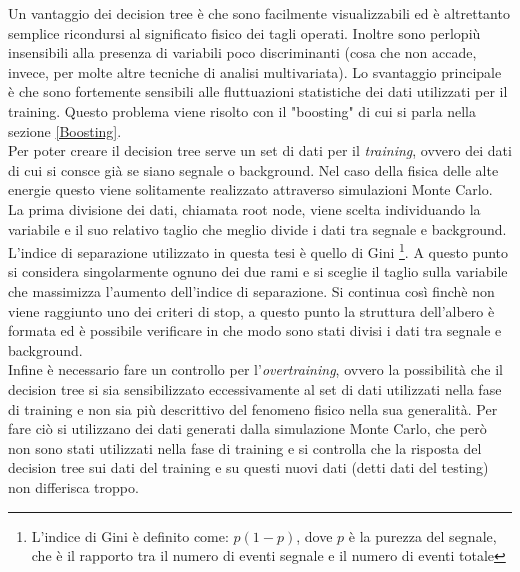     Un vantaggio dei decision tree è che sono facilmente visualizzabili ed è altrettanto semplice ricondursi al significato fisico dei tagli operati. Inoltre sono perlopiù insensibili alla presenza di variabili poco discriminanti (cosa che non accade, invece, per molte altre tecniche di analisi multivariata). Lo svantaggio principale è che sono fortemente sensibili alle fluttuazioni statistiche dei dati utilizzati per il training. Questo problema viene risolto con il "boosting" di cui si parla nella sezione  \ref{Boosting}.
    \\Per poter creare il decision tree serve un set di dati per il \textit{training}, ovvero dei dati di cui si consce già se siano segnale o background. Nel caso della fisica delle alte energie questo viene solitamente realizzato attraverso simulazioni Monte Carlo. La prima divisione dei dati, chiamata root node, viene scelta individuando la variabile e il suo relativo taglio che meglio divide i dati tra segnale e background. L'indice di separazione utilizzato in questa tesi è quello di Gini \footnote{L'indice di Gini è definito come: $p (1-p)$, dove $p$ è la purezza del segnale, che è il rapporto tra il numero di eventi segnale e il numero di eventi totale}. A questo punto si considera singolarmente ognuno dei due rami e si sceglie il taglio sulla variabile che massimizza l'aumento dell'indice di separazione. Si continua così finchè non viene raggiunto uno dei criteri di stop,  a questo punto la struttura dell'albero è formata ed è possibile verificare in che modo sono stati divisi i dati tra segnale e background. 
    \\Infine è necessario fare un controllo per l'\textit{overtraining}, ovvero la possibilità che il decision tree si sia sensibilizzato eccessivamente al set di dati utilizzati nella fase di training e non sia più descrittivo del fenomeno fisico nella sua generalità. Per fare ciò si utilizzano dei dati generati dalla simulazione Monte Carlo, che però non sono stati utilizzati nella fase di training e si controlla che la risposta del decision tree sui dati del training e su questi nuovi dati (detti dati del testing) non differisca troppo.\cite{TMVAGuide} 
 
